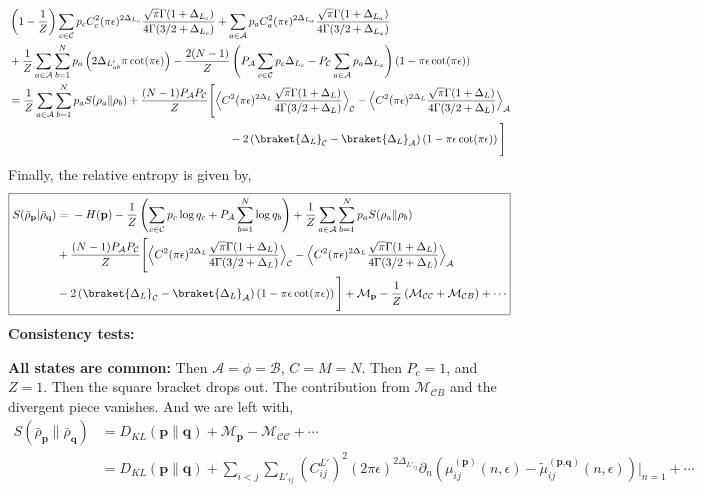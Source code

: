 \documentclass[11pt]{article}
\newcommand{\ep}{\epsilon}
\newcommand{\p}{\partial}
\newcommand{\nn}{\nonumber}
\newcommand{\lb}{\left(}
\newcommand{\rb}{\right)}
\begin{document}
\begin{align}
    &\lb1-\frac{1}{Z}\rb
\sum_{c\in\mathcal{C}}p_c C_c^2
(\pi\ep)^{2\Delta_{L_c}}
\frac{\sqrt \pi \Gamma(1+ \Delta_{L_c})}{4\Gamma(3/2 + \Delta_{L_c})} +\sum_{a\in\mathcal{A}}p_a C_a^2
(\pi\ep)^{2\Delta_{L_a}}
\frac{\sqrt \pi \Gamma(1+ \Delta_{L_a})}{4\Gamma(3/2 + \Delta_{L_a})} 
\nn \\
&+\frac{1}{Z}
\sum_{a\in\mathcal{A}}\sum_{b=1}^N
p_a\lb2\Delta_{L'_{ab}}\pi\cot(\pi\ep)\rb -\frac{2(N-1)}{Z} \lb  P_\mathcal{A}\sum_{c\in\mathcal{C}} p_c\Delta_{L_c} - P_\mathcal{C} \sum_{a\in\mathcal{A}} p_a\Delta_{L_a} \rb (1-\pi \ep\cot(\pi\ep)) \\
&= \frac{1}{Z}\sum_{a\in\mathcal{A}}\sum_{b=1}^N p_a S(\rho_a\|\rho_b) + \frac{(N-1)P_\mathcal{A}P_\mathcal{C}}{Z}\Bigg[ \Big\langle{C^2(\pi\ep)^{2\Delta_L}\frac{\sqrt \pi \Gamma(1+ \Delta_{L})}{4\Gamma(3/2 + \Delta_{L})} } \Big\rangle_\mathcal{C}- \Big\langle{C^2(\pi\ep)^{2\Delta_L}\frac{\sqrt \pi \Gamma(1+ \Delta_{L})}{4\Gamma(3/2 + \Delta_{L})} } \Big\rangle_\mathcal{A} \nn \\&\qquad\qquad\qquad\qquad\qquad\qquad\qquad\qquad\qquad\qquad -2\lb\braket{\Delta_L}_\mathcal{C}-\braket{\Delta_L}_\mathcal{A}\rb\lb1-\pi\ep\cot(\pi\ep)\rb\Bigg]
\end{align}
Finally, the relative entropy is given by,
\begin{align}
\boxed{
\begin{aligned}
S(\bar\rho_{\textbf{p}} | \bar\rho_{\textbf{q}})
&={}-H(\textbf{p})
-\frac{1}{Z}\lb
\sum_{c\in\mathcal{C}}p_c\log q_c
+P_\mathcal{A}\sum_{b=1}^N\log q_b
\rb + \frac{1}{Z}\sum_{a\in\mathcal{A}}\sum_{b=1}^N p_a S(\rho_a\|\rho_b)  
\\
&+\frac{(N-1)P_\mathcal{A}P_\mathcal{C}}{Z}\Bigg[ \Big\langle{C^2(\pi\ep)^{2\Delta_L}\frac{\sqrt \pi \Gamma(1+ \Delta_{L})}{4\Gamma(3/2 + \Delta_{L})} } \Big\rangle_\mathcal{C}- \Big\langle{C^2(\pi\ep)^{2\Delta_L}\frac{\sqrt \pi \Gamma(1+ \Delta_{L})}{4\Gamma(3/2 + \Delta_{L})} } \Big\rangle_\mathcal{A}  \\
&-2\lb\braket{\Delta_L}_\mathcal{C}-\braket{\Delta_L}_\mathcal{A}\rb\lb1-\pi\ep\cot(\pi\ep)\rb\Bigg]+\mathcal{M}_{\textbf{p}}
-\frac{1}{Z}\lb
\mathcal{M}_{\mathcal{C}\mathcal{C}}
+\mathcal{M}_{\mathcal{C}B}
\rb
+ \cdots
\end{aligned}
}
\end{align}
\textbf{Consistency tests:}

\textbf{All states are common:} Then $\mathcal{A} = \phi = \mathcal{B}$, $C=M=N$. Then $P_c =1$, and $Z=1$. Then the square bracket drops out. The contribution from $\mathcal{M}_{\mathcal{C}B}$ and the divergent piece vanishes. And we are left with,
\begin{align}
    S(\bar \rho_{\textbf{p}} \| \bar \rho_{\textbf{q}})&= D_{KL}(\textbf{p}\| \textbf{q}) + \mathcal{M}_{\textbf{p}} - \mathcal{M}_{\mathcal{C}\mathcal{C}} + \cdots \\ 
    &= D_{KL}(\textbf{p}\|\textbf{q}) +  \sum_{i<j}\sum_{L'_{ij}}\lb C_{ij}^{L'}\rb^2 (2\pi\ep)^{2\Delta_{L'_{ij}}} \p_n \lb\mu_{ij}^{(\textbf{p})}(n,\ep)- \tilde{\mu}_{ij}^{(\textbf{p,q})}(n,\ep)\rb\Big|_{n=1}+\cdots
\end{align}
\end{document}
